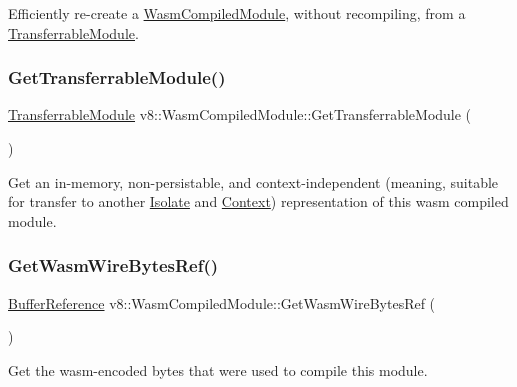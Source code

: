 Efficiently re-\/create a \mbox{\hyperlink{classv8_1_1WasmCompiledModule}{Wasm\+Compiled\+Module}}, without recompiling, from a \mbox{\hyperlink{classv8_1_1WasmCompiledModule_1_1TransferrableModule}{Transferrable\+Module}}. \mbox{\label{classv8_1_1WasmCompiledModule_a5872dd7762bf1c1ebcef833d8356f6ad}} 
\subsubsection{\texorpdfstring{Get\+Transferrable\+Module()}{GetTransferrableModule()}}
{\footnotesize\ttfamily \mbox{\hyperlink{classv8_1_1WasmCompiledModule_1_1TransferrableModule}{Transferrable\+Module}} v8\+::\+Wasm\+Compiled\+Module\+::\+Get\+Transferrable\+Module (\begin{DoxyParamCaption}{ }\end{DoxyParamCaption})}

Get an in-\/memory, non-\/persistable, and context-\/independent (meaning, suitable for transfer to another \mbox{\hyperlink{classv8_1_1Isolate}{Isolate}} and \mbox{\hyperlink{classv8_1_1Context}{Context}}) representation of this wasm compiled module. \mbox{\label{classv8_1_1WasmCompiledModule_ad889c2d766016ebf74b7093e8b210aa2}} 
\subsubsection{\texorpdfstring{Get\+Wasm\+Wire\+Bytes\+Ref()}{GetWasmWireBytesRef()}}
{\footnotesize\ttfamily \mbox{\hyperlink{structv8_1_1WasmCompiledModule_1_1BufferReference}{Buffer\+Reference}} v8\+::\+Wasm\+Compiled\+Module\+::\+Get\+Wasm\+Wire\+Bytes\+Ref (\begin{DoxyParamCaption}{ }\end{DoxyParamCaption})}

Get the wasm-\/encoded bytes that were used to compile this module. \mbox{\label{classv8_1_1WasmCompiledModule_a56ba174cfc319056ecdfc870e6c9d832}} 
